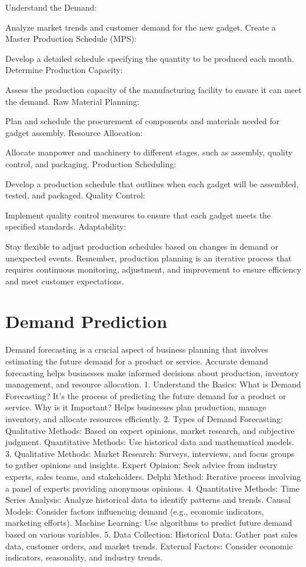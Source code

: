 Understand the Demand:

Analyze market trends and customer demand for the new gadget.
Create a Master Production Schedule (MPS):

Develop a detailed schedule specifying the quantity to be produced each month.
Determine Production Capacity:

Assess the production capacity of the manufacturing facility to ensure it can meet the demand.
Raw Material Planning:

Plan and schedule the procurement of components and materials needed for gadget assembly.
Resource Allocation:

Allocate manpower and machinery to different stages, such as assembly, quality control, and packaging.
Production Scheduling:

Develop a production schedule that outlines when each gadget will be assembled, tested, and packaged.
Quality Control:

Implement quality control measures to ensure that each gadget meets the specified standards.
Adaptability:

Stay flexible to adjust production schedules based on changes in demand or unexpected events.
Remember, production planning is an iterative process that requires continuous monitoring, adjustment, and improvement to ensure efficiency and meet customer expectations. 

% 
\section{Demand Prediction}
\label{relatedknowledge:Demand Prediction}
% 
Demand forecasting is a crucial aspect of business planning that involves estimating the future demand for a product or service. Accurate demand forecasting helps businesses make informed decisions about production, inventory management, and resource allocation.
1. Understand the Basics:
What is Demand Forecasting? It's the process of predicting the future demand for a product or service.
Why is it Important? Helps businesses plan production, manage inventory, and allocate resources efficiently.
2. Types of Demand Forecasting:
Qualitative Methods: Based on expert opinions, market research, and subjective judgment.
Quantitative Methods: Use historical data and mathematical models.
3. Qualitative Methods:
Market Research: Surveys, interviews, and focus groups to gather opinions and insights.
Expert Opinion: Seek advice from industry experts, sales teams, and stakeholders.
Delphi Method: Iterative process involving a panel of experts providing anonymous opinions.
4. Quantitative Methods:
Time Series Analysis: Analyze historical data to identify patterns and trends.
Causal Models: Consider factors influencing demand (e.g., economic indicators, marketing efforts).
Machine Learning: Use algorithms to predict future demand based on various variables.
5. Data Collection:
Historical Data: Gather past sales data, customer orders, and market trends.
External Factors: Consider economic indicators, seasonality, and industry trends.

